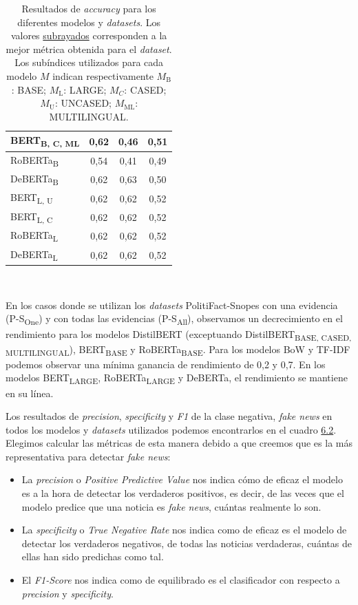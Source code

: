 \begin{table}[!h]
\begin{center}
\begin{tabular}{lccc}
        {BERT}\textsubscript{B, C, ML} & 0,62 & 0,46 & 0,51 \\ \hline
        {RoBERTa}\textsubscript{B} & 0,54 & 0,41 & 0,49 \\ \hline
        {DeBERTa}\textsubscript{B} & 0,62 & 0,63 & 0,50 \\ \hline
        {BERT}\textsubscript{L, U} & 0,62 & 0,62 & 0,52 \\
        {BERT}\textsubscript{L, C} & 0,62 & 0,62 & 0,52 \\ \hline
        {RoBERTa}\textsubscript{L} & 0,62 & 0,62 & 0,52 \\ \hline
        {DeBERTa}\textsubscript{L} & 0,62 & 0,62 & 0,52 \\ \hline
    \end{tabular} \\
    \caption{Resultados de \textit{accuracy} para los diferentes modelos y \textit{datasets}. Los valores \underline{subrayados} corresponden a la mejor métrica obtenida para el \textit{dataset}. Los subíndices utilizados para cada modelo $M$ indican respectivamente $M_{\text{B}}$: BASE; $M_{\text{L}}$: LARGE; $M_{C}$: CASED; $M_{\text{U}}$: UNCASED; $M_{\text{ML}}$: MULTILINGUAL.}
    \label{tab:acc}
\end{center}
\end{table}



En los casos donde se utilizan los \textit{datasets} PolitiFact-Snopes con una evidencia ({P-S}\textsubscript{One}) y con todas las evidencias ({P-S}\textsubscript{All}), observamos un decrecimiento en el rendimiento para los modelos DistilBERT (exceptuando {DistilBERT}\textsubscript{BASE, CASED, MULTILINGUAL}), {BERT}\textsubscript{BASE} y {RoBERTa}\textsubscript{BASE}. Para los modelos BoW y TF-IDF podemos observar una mínima ganancia de rendimiento de 0,2 y 0,7. En los modelos {BERT}\textsubscript{LARGE}, {RoBERTa}\textsubscript{LARGE} y DeBERTa, el rendimiento se mantiene en su línea.

Los resultados de \textit{precision}, \textit{specificity} y \textit{F1} de la clase negativa, \textit{fake news} en todos los modelos y \textit{datasets} utilizados podemos encontrarlos en el cuadro \hyperref[tab:other-metrics]{6.2}. Elegimos calcular las métricas de esta manera debido a que creemos que es la más representativa para detectar \textit{fake news}: 
\begin{itemize}
    \item La \textit{precision} o \textit{Positive Predictive Value} nos indica cómo de eficaz el modelo es a la hora de detectar los verdaderos positivos, es decir, de las veces que el modelo predice que una noticia es \textit{fake news}, cuántas realmente lo son.
    \item La \textit{specificity} o \textit{True Negative Rate} nos indica como de eficaz es el modelo de detectar los verdaderos negativos, de todas las noticias verdaderas, cuántas de ellas han sido predichas como tal.
    \item El \textit{F1-Score} nos indica como de equilibrado es el clasificador con respecto a \textit{precision} y \textit{specificity}.
\end{itemize}

